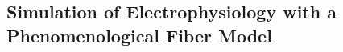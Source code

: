 % 
% 
% 
% 
% 
% 




\subsection{Simulation of Electrophysiology with a Phenomenological Fiber Model}\label{sec:sim_rosenfalck}

